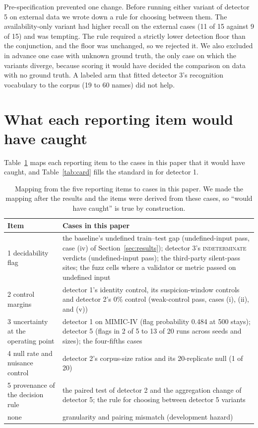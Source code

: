 \documentclass[10pt]{article}
\theoremstyle{definition}
\begin{document}
Pre-specification prevented one change. Before running either variant of detector 5 on external data we wrote down a rule for choosing between them. The availability-only variant had higher recall on the external cases (11 of 15 against 9 of 15) and was tempting. The rule required a strictly lower detection floor than the conjunction, and the floor was unchanged, so we rejected it. We also excluded in advance one case with unknown ground truth, the only case on which the variants diverge, because scoring it would have decided the comparison on data with no ground truth. A labeled arm that fitted detector 3's recognition vocabulary to the corpus (19 to 60 names) did not help.

\section{What each reporting item would have caught}
\label{apd:standard}
Table~\ref{tab:standardmap} maps each reporting item to the cases in this paper that it would have caught, and Table~\ref{tab:card} fills the standard in for detector 1.

\begin{table}[h]
\centering\footnotesize
\begin{tabular}{@{}p{3.6cm}p{9.2cm}@{}}
\toprule
Item & Cases in this paper\\
\midrule
1 decidability flag & the baseline's undefined train--test gap (undefined-input pass, case (iv) of Section~\ref{sec:results}); detector 3's \textsc{indeterminate} verdicts (undefined-input pass); the third-party silent-pass sites; the fuzz cells where a validator or metric passed on undefined input\\
2 control margins & detector 1's identity control, its suspicion-window controls and detector 2's 0\% control (weak-control pass, cases (i), (ii), and (v))\\
3 uncertainty at the operating point & detector 1 on MIMIC-IV (flag probability 0.484 at 500 stays); detector 5 (flags in 2 of 5 to 13 of 20 runs across seeds and sizes); the four-fifths cases\\
4 null rate and nuisance control & detector 2's corpus-size ratios and its 20-replicate null (1 of 20)\\
5 provenance of the decision rule & the paired test of detector 2 and the aggregation change of detector 5; the rule for choosing between detector 5 variants\\
none & granularity and pairing mismatch (development hazard)\\
\bottomrule
\end{tabular}
\caption{Mapping from the five reporting items to cases in this paper. We made the mapping after the results and the items were derived from these cases, so ``would have caught'' is true by construction.}
\label{tab:standardmap}
\end{table}
\end{document}

